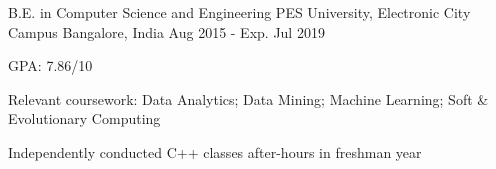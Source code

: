 

\begin{cventries}

  \cventry
    {B.E. in Computer Science and Engineering} %
    {PES University, Electronic City Campus} %
    {Bangalore, India} %
    {Aug 2015 - Exp. Jul 2019} %
    {
      \begin{cvitems} %
        \item {GPA: 7.86/10}
        \item {Relevant coursework: Data Analytics; Data Mining; Machine Learning; Soft \& Evolutionary Computing}
        \item {Independently conducted C++ classes after-hours in freshman year}
      \end{cvitems}
    }

\end{cventries}
